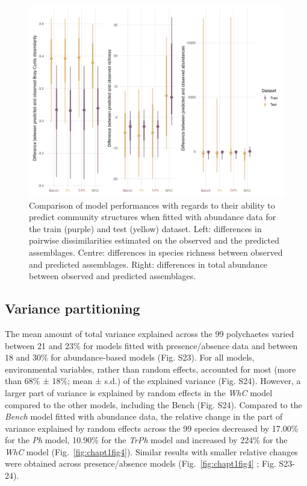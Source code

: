 \begin{refsection}
\begin{figure}
\hypertarget{fig:chapt1fig3}{%
\centering
\includegraphics{03-Chapitre1/figures/fig3.png}
\caption[Comparison of model performances with regards to their ability
to predict community structures when fitted with abundance data.]{Comparison of model performances with regards to their ability
to predict community structures when fitted with abundance data for the
train (purple) and test (yellow) dataset. Left: differences in pairwise
dissimilarities estimated on the observed and the predicted assemblages.
Centre: differences in species richness between observed and predicted
assemblages. Right: differences in total abundance between observed and
predicted assemblages.}\label{fig:chapt1fig3}
}
\end{figure}

\hypertarget{variance-partitioning}{%
\subsection{Variance partitioning}\label{variance-partitioning}}

The mean amount of total variance explained across the 99 polychaetes
varied between 21 and 23\% for models fitted with presence/absence data
and between 18 and 30\% for abundance-based models (Fig. S23). For all
models, environmental variables, rather than random effects, accounted
for most (more than 68\% ± 18\%; mean ± s.d.) of the explained variance
(Fig. S24). However, a larger part of variance is explained by random
effects in the \emph{WhC} model compared to the other models, including
the Bench (Fig. S24). Compared to the \emph{Bench} model fitted with
abundance data, the relative change in the part of variance explained by
random effects across the 99 species decreased by 17.00\% for the
\emph{Ph} model, 10.90\% for the \emph{TrPh} model and increased by
224\% for the \emph{WhC} model (Fig.~\ref{fig:chapt1fig4}). Similar
results with smaller relative changes were obtained across
presence/absence models (Fig.~\ref{fig:chapt1fig4} ; Fig. S23-24).


\end{refsection}
